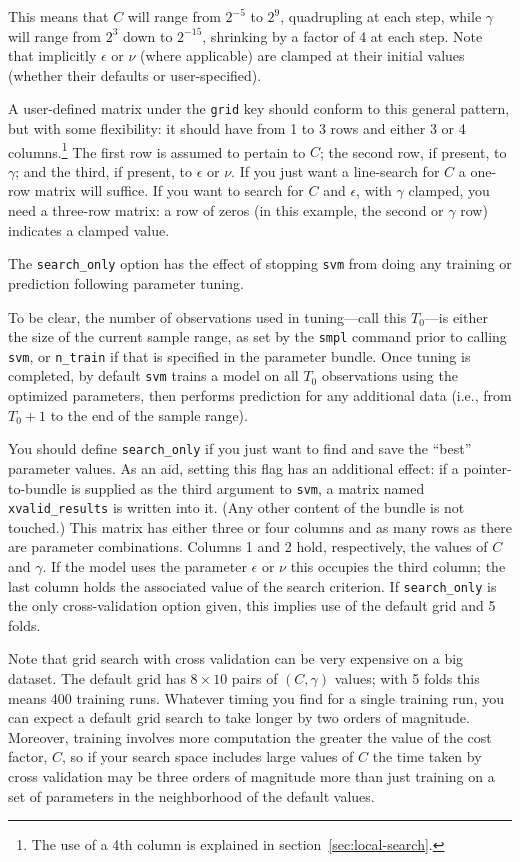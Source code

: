 \documentclass{article}
\begin{document}
This means that $C$ will range from $2^{-5}$ to $2^9$, quadrupling at
each step, while $\gamma$ will range from $2^3$ down to $2^{-15}$,
shrinking by a factor of 4 at each step. Note that implicitly
$\epsilon$ or $\nu$ (where applicable) are clamped at their initial
values (whether their defaults or user-specified).

A user-defined matrix under the \texttt{grid} key should conform to
this general pattern, but with some flexibility: it should have from 1
to 3 rows and either 3 or 4 columns.\footnote{The use of a 4th column
  is explained in section~\ref{sec:local-search}.} The first row is
assumed to pertain to $C$; the second row, if present, to $\gamma$;
and the third, if present, to $\epsilon$ or $\nu$. If you just want a
line-search for $C$ a one-row matrix will suffice.  If you want to
search for $C$ and $\epsilon$, with $\gamma$ clamped, you need a
three-row matrix: a row of zeros (in this example, the second or
$\gamma$ row) indicates a clamped value.

The \texttt{search\_only} option has the effect of stopping
\texttt{svm} from doing any training or prediction following parameter
tuning.

To be clear, the number of observations used in tuning---call this
$T_0$---is either the size of the current sample range, as set by the
\texttt{smpl} command prior to calling \texttt{svm}, or
\texttt{n\_train} if that is specified in the parameter bundle. Once
tuning is completed, by default \texttt{svm} trains a model on all
$T_0$ observations using the optimized parameters, then performs
prediction for any additional data (i.e., from $T_0 + 1$ to the end of
the sample range).

You should define \texttt{search\_only} if you just want to find and
save the ``best'' parameter values. As an aid, setting this flag has
an additional effect: if a pointer-to-bundle is supplied as the third
argument to \texttt{svm}, a matrix named \texttt{xvalid\_results} is
written into it. (Any other content of the bundle is not touched.)
This matrix has either three or four columns and as many rows as there
are parameter combinations. Columns 1 and 2 hold, respectively, the
values of $C$ and $\gamma$.  If the model uses the parameter
$\epsilon$ or $\nu$ this occupies the third column; the last column
holds the associated value of the search criterion.  If
\texttt{search\_only} is the only cross-validation option given, this
implies use of the default grid and 5 folds.

Note that grid search with cross validation can be very expensive on a
big dataset. The default grid has $8 \times 10$ pairs of $(C, \gamma)$
values; with 5 folds this means 400 training runs. Whatever timing you
find for a single training run, you can expect a default grid search
to take longer by two orders of magnitude. Moreover, training involves
more computation the greater the value of the cost factor, $C$, so if
your search space includes large values of $C$ the time taken by cross
validation may be three orders of magnitude more than just training on
a set of parameters in the neighborhood of the default values.
\end{document}
